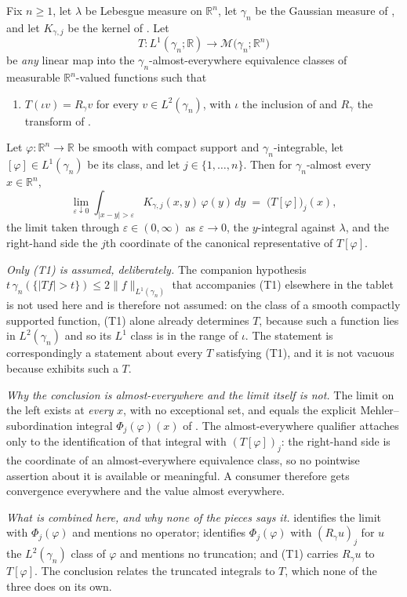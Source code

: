 \begin{lemma}
Fix $n \geq 1$, let $\lambda$ be Lebesgue measure on $\mathbb{R}^n$, let
$\gamma_n$ be the Gaussian measure of , and let
$K_{\gamma,j}$ be the kernel of .  Let
\[
  T : L^1(\gamma_n;\mathbb{R}) \longrightarrow
      \mathcal{M}\bigl(\gamma_n;\mathbb{R}^n\bigr)
\]
be \emph{any} linear map into the $\gamma_n$-almost-everywhere equivalence
classes of measurable $\mathbb{R}^n$-valued functions such that
\begin{enumerate}
\item[(T1)] $T(\iota v) = R_\gamma v$ for every $v \in L^2(\gamma_n)$, with
$\iota$ the inclusion of  and $R_\gamma$ the transform of
.
\end{enumerate}
Let $\varphi : \mathbb{R}^n \to \mathbb{R}$ be smooth with compact support and
$\gamma_n$-integrable, let $[\varphi] \in L^1(\gamma_n)$ be its class, and let
$j \in \{1,\ldots,n\}$.  Then for $\gamma_n$-almost every $x \in \mathbb{R}^n$,
\[
  \lim_{\varepsilon\downarrow0}
    \int_{|x-y|>\varepsilon}K_{\gamma,j}(x,y)\,\varphi(y)\,dy
  \;=\; \bigl(T[\varphi]\bigr)_j(x) ,
\]
the limit taken through $\varepsilon \in (0,\infty)$ as $\varepsilon \to 0$,
the $y$-integral against $\lambda$, and the right-hand side the $j$th
coordinate of the canonical representative of $T[\varphi]$.

\emph{Only (T1) is assumed, deliberately.}  The companion hypothesis
$t\,\gamma_n(\{|Tf| > t\}) \leq 2\|f\|_{L^1(\gamma_n)}$ that accompanies (T1)
elsewhere in the tablet is not used here and is therefore not assumed: on the
class of a smooth compactly supported function, (T1) alone already determines
$T$, because such a function lies in $L^2(\gamma_n)$ and so its $L^1$ class is
in the range of $\iota$.  The statement is correspondingly a statement about
every $T$ satisfying (T1), and it is not vacuous because 
exhibits such a $T$.

\emph{Why the conclusion is almost-everywhere and the limit itself is not.}
The limit on the left exists at \emph{every} $x$, with no exceptional set, and
equals the explicit Mehler--subordination integral $\Phi_j(\varphi)(x)$ of
.  The almost-everywhere qualifier attaches only to the
identification of that integral with $(T[\varphi])_j$: the right-hand side is
the coordinate of an almost-everywhere equivalence class, so no pointwise
assertion about it is available or meaningful.  A consumer therefore gets
convergence everywhere and the value almost everywhere.

\emph{What is combined here, and why none of the pieces says it.}
 identifies the limit with $\Phi_j(\varphi)$ and mentions
no operator;  identifies $\Phi_j(\varphi)$
with $(R_\gamma u)_j$ for $u$ the $L^2(\gamma_n)$ class of $\varphi$ and
mentions no truncation; and (T1) carries $R_\gamma u$ to $T[\varphi]$.  The
conclusion relates the truncated integrals to $T$, which none of the three does
on its own.
\end{lemma}
